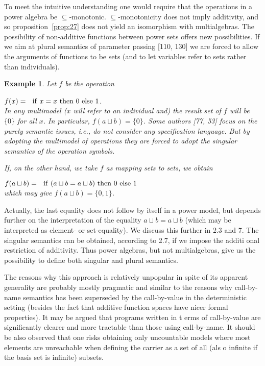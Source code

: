 \documentclass[10pt]{article}
\newcommand{\ch}{\sqcup}
\newcounter{CLAIM}[section]
\newtheorem{Example}[CLAIM]{Example}
\begin{document}
To meet the intuitive 
understanding one would require that the operations in a power 
algebra be $\subseteq$-monotonic. $\subseteq$-monotonicity does 
not imply additivity, and so proposition~\ref{prop:27} does 
not yield an isomorphism with multialgebras. The possibility of 
non-additive functions between power sets offers new possibilities. 
If we aim at plural semantics of parameter passing [110, 130] we are 
forced to allow the arguments of 
functions to be sets (and to let variables refer to sets rather than 
individuals). 

\begin{Example} %
Let $f$ be the operation 

$f(x) = {\ \ \rm if\ }x=x{\rm\ then\ }0{\rm\ else\ }1$. \\
%
In any multimodel ($x$ will 
refer to an individual and) the result set of $f$ will be $\{0\}$
for all $x$. In particular, 
$f(a\ch b)=\{0\}$. Some authors [77, 53] focus on the purely semantic issues, i.e., do 
not consider any specification language. But by adopting the 
multimodel of operations they are forced to adopt the singular 
semantics of the operation symbols. 

If, on the other hand, we take 
$f$ as mapping sets to sets, we obtain 

$f(a\ch b) = {\ \ \rm if\ }(a\ch b = a\ch b){\rm\ then\ }0{\rm\ else\ 
}1$\\
%
which may give $f(a\ch b)=\{0,1\}$.
\end{Example}

\noindent
Actually, the last equality does 
not follow by itself in a power model, but depends further on the 
interpretation of the equality $a\ch b = a\ch b$
 (which may be interpreted as element- or set-equality). We discuss 
this further in 2.3 and 7. The singular semantics can be obtained, 
according to 2.7, if we impose the additi
onal restriction of additivity. Thus power algebras, but not 
multialgebras, give us the possibility to define both singular and 
plural semantics.


The reasons why this approach is relatively unpopular in spite of its 
apparent generality are probably mostly pragmatic and similar to the 
reasons why call-by-name semantics has been superseded by the 
call-by-value in the deterministic setting (besides the
fact that additive function spaces have nicer formal properties). It 
may be argued that programs written in t
erms of call-by-value are significantly clearer and more tractable 
than those using call-by-name. It should be also observed that one 
risks obtaining only uncountable models where most elements are 
unreachable when defining the carrier as a set of all (als
o infinite if the basis set is infinite) subsets. 
\end{document}
